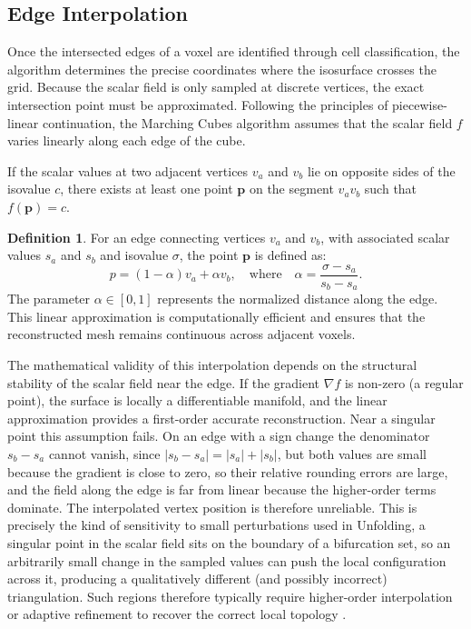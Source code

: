\documentclass[12pt, a4paper, oneside]{book}
\theoremstyle{plain}
\theoremstyle{definition}
\newtheorem{definition}[theorem]{Definition}
\theoremstyle{remark}
\theoremstyle{definition}
\begin{document}
\subsection{Edge Interpolation}

Once the intersected edges of a voxel are identified through cell classification, the algorithm determines the precise coordinates where the isosurface crosses the grid. Because the scalar field is only sampled at discrete vertices, the exact intersection point must be approximated. Following the principles of piecewise-linear continuation, the Marching Cubes algorithm assumes that the scalar field $f$ varies linearly along each edge of the cube.

If the scalar values at two adjacent vertices $v_a$ and $v_b$ lie on opposite sides of the isovalue $c$, there exists at least one point $\mathbf{p}$ on the segment $v_a v_b$ such that $f(\mathbf{p}) = c$.

\begin{definition}%
\label{def:edge-interp}
For an edge connecting vertices $v_a$ and $v_b$, with associated scalar values $s_a$ and $s_b$ and isovalue $\sigma$, the point $\mathbf{p}$ is defined as:
\begin{equation}
p = (1 - \alpha) v_a + \alpha v_b, \quad \text{where} \quad \alpha = \frac{\sigma - s_a}{s_b - s_a}.
\end{equation}
The parameter $\alpha \in [0, 1]$ represents the normalized distance along the edge. This linear approximation is computationally efficient and ensures that the reconstructed mesh remains continuous across adjacent voxels.
\end{definition}

The mathematical validity of this interpolation depends on the structural stability of the scalar field near the edge. If the gradient $\nabla f$ is non-zero (a regular point), the surface is locally a differentiable manifold, and the linear approximation provides a first-order accurate reconstruction. Near a singular point this assumption fails. On an edge with a sign change the denominator $s_b - s_a$ cannot vanish, since $|s_b-s_a|=|s_a|+|s_b|$, but both values are small because the gradient is close to zero, so their relative rounding errors are large, and the field along the edge is far from linear because the higher-order terms dominate. The interpolated vertex position is therefore unreliable. This is precisely the kind of sensitivity to small perturbations used in Unfolding, a singular point in the scalar field sits on the boundary of a bifurcation set, so an arbitrarily small change in the sampled values can push the local configuration across it, producing a qualitatively different (and possibly incorrect) triangulation. Such regions therefore typically require higher-order interpolation or adaptive refinement to recover the correct local topology \cite{frisken2000adaptively}.
\end{document}
